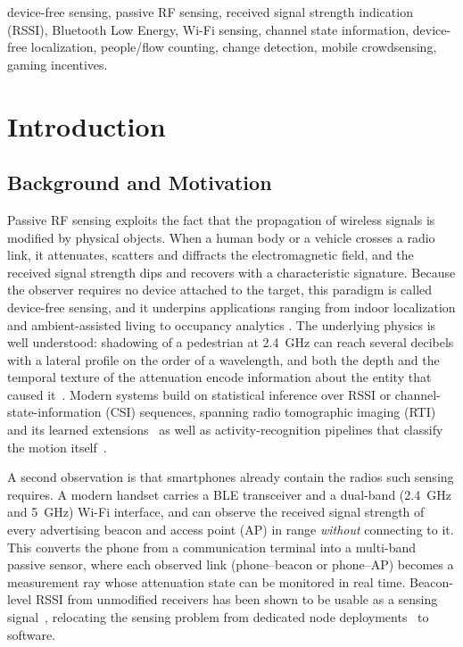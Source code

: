 \documentclass[journal,10pt]{IEEEtran}
\begin{document}
\begin{IEEEkeywords}
device-free sensing, passive RF sensing, received signal strength indication
(RSSI), Bluetooth Low Energy, Wi-Fi sensing, channel state information,
device-free localization, people/flow counting, change detection, mobile
crowdsensing, gaming incentives.
\end{IEEEkeywords}

\section{Introduction}
\subsection{Background and Motivation}
Passive RF sensing exploits the fact that the propagation of wireless
signals is modified by physical objects. When a human body or a vehicle
crosses a radio link, it attenuates, scatters and diffracts the
electromagnetic field, and the received signal strength dips and recovers
with a characteristic signature. Because the observer requires no device
attached to the target, this paradigm is called device-free sensing, and it
underpins applications ranging from indoor localization and
ambient-assisted living to occupancy analytics \cite{wilson2010}. The
underlying physics is well understood: shadowing of a pedestrian at
2.4~GHz can reach several decibels with a lateral profile on the order of a
wavelength, and both the depth and the temporal texture of the attenuation
encode information about the entity that caused it~\cite{januszkiewicz2018}.
Modern systems build on statistical inference over RSSI or
channel-state-information (CSI) sequences, spanning radio tomographic
imaging (RTI) and its learned extensions~\cite{alippi2016,li2024,wu2024,cnnrti2025}
as well as activity-recognition pipelines that classify the motion
itself~\cite{wong2024,sanchez2020}.

A second observation is that smartphones already contain the radios such
sensing requires. A modern handset carries a BLE transceiver and a dual-band
(2.4~GHz and 5~GHz) Wi-Fi interface, and can observe the received signal
strength of every advertising beacon and access point (AP) in range
\emph{without} connecting to it. This converts the phone from a
communication terminal into a multi-band passive sensor, where each observed
link (phone--beacon or phone--AP) becomes a measurement ray whose
attenuation state can be monitored in real time. Beacon-level RSSI from
unmodified receivers has been shown to be usable as a sensing
signal~\cite{ramirez2021,milano2024,bai2020}, relocating the sensing problem
from dedicated node deployments~\cite{wilson2010,alippi2016} to software.
\end{document}
